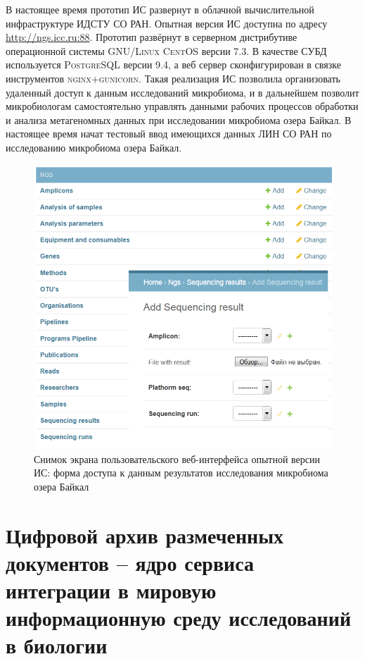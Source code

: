 \documentclass[a4paper,12pt,openany,final]{extreport}
\def\oldcaption{} \let\oldcaption=\caption
\def\caption{\stepcounter{captionsnum}\oldcaption}
\begin{document}
В настоящее время прототип ИС развернут в облачной вычислительной
инфраструктуре ИДСТУ СО РАН. Опытная версия ИС доступна по адресу
\href{http://ngs.icc.ru:88}{{http://ngs.icc.ru:88}}. Прототип развёрнут
в серверном дистрибутиве операционной системы \textsc{GNU/Linux CentOS}
версии 7.3. В качестве СУБД используется \textsc{PostgreSQL} версии 9.4,
а веб сервер сконфигурирован в связке инструментов
\textsc{nginx+gunicorn}. Такая реализация ИС позволила организовать
удаленный доступ к данным исследований микробиома, и в дальнейшем
позволит микробиологам самостоятельно управлять данными рабочих
процессов обработки и анализа метагеномных данных при исследовании
микробиома озера Байкал. В настоящее время начат тестовый ввод имеющихся
данных ЛИН СО РАН по исследованию микробиома озера Байкал.

\begin{figure}\centering
\includegraphics[width=0.9\linewidth]{media/image17.png}

\caption{Снимок экрана пользовательского веб-интерфейса опытной
версии ИС: форма доступа к данным результатов исследования микробиома
озера Байкал}
\end{figure}

\chapter{Цифровой архив размеченных документов -- ядро
сервиса интеграции в мировую информационную среду исследований в
биологии}\label{chap:7}
\end{document}
